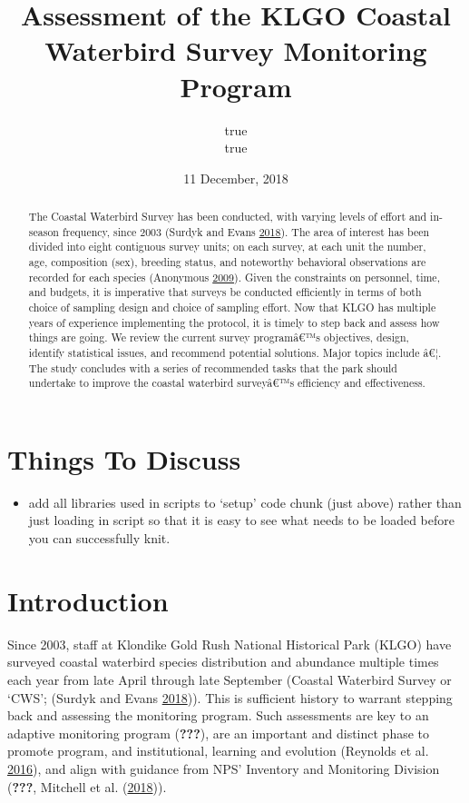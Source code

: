 \documentclass[]{article}
\title{Assessment of the KLGO Coastal Waterbird Survey Monitoring Program}
\author{true \\ true}
\date{11 December, 2018}
\newcommand{\euro}{€}
\providecommand{\tightlist}{%
  \setlength{\itemsep}{0pt}\setlength{\parskip}{0pt}}
\begin{document}
\maketitle
\begin{abstract}
The Coastal Waterbird Survey has been conducted, with varying levels of
effort and in-season frequency, since 2003 (Surdyk and Evans
\protect\hyperlink{ref-Surdyk2018}{2018}). The area of interest has been
divided into eight contiguous survey units; on each survey, at each unit
the number, age, composition (sex), breeding status, and noteworthy
behavioral observations are recorded for each species (Anonymous
\protect\hyperlink{ref-Anonymous2009}{2009}). Given the constraints on
personnel, time, and budgets, it is imperative that surveys be conducted
efficiently in terms of both choice of sampling design and choice of
sampling effort. Now that KLGO has multiple years of experience
implementing the protocol, it is timely to step back and assess how
things are going. We review the current survey programâ\euro{}™s
objectives, design, identify statistical issues, and recommend potential
solutions. Major topics include â\euro{}¦. The study concludes with a
series of recommended tasks that the park should undertake to improve
the coastal waterbird surveyâ\euro{}™s efficiency and effectiveness.
\end{abstract}

{
\setcounter{tocdepth}{2}
\tableofcontents
}
\section{Things To Discuss}\label{things-to-discuss}

\begin{itemize}
\tightlist
\item
  add all libraries used in scripts to `setup' code chunk (just above)
  rather than just loading in script so that it is easy to see what
  needs to be loaded before you can successfully knit.
\end{itemize}

\section{Introduction}\label{introduction}

Since 2003, staff at Klondike Gold Rush National Historical Park (KLGO)
have surveyed coastal waterbird species distribution and abundance
multiple times each year from late April through late September (Coastal
Waterbird Survey or `CWS'; (Surdyk and Evans
\protect\hyperlink{ref-Surdyk2018}{2018})). This is sufficient history
to warrant stepping back and assessing the monitoring program. Such
assessments are key to an adaptive monitoring program ({\textbf{???}}),
are an important and distinct phase to promote program, and
institutional, learning and evolution (Reynolds et al.
\protect\hyperlink{ref-Reynolds2016}{2016}), and align with guidance
from NPS' Inventory and Monitoring Division ({\textbf{???}}, Mitchell et
al. (\protect\hyperlink{ref-Mitchell2018}{2018})).
\end{document}

